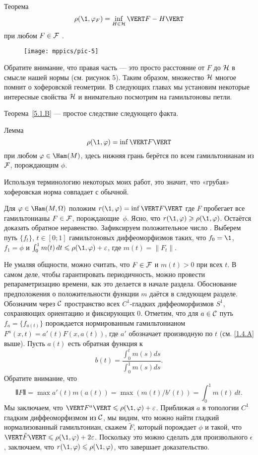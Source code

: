 \begin{thm}{Теорема}\label{5.1.B}
\[\rho (\1, \phi_F) = \inf_{H\in\H} \VERT F - H \VERT\]
при любом $F \in \mathcal{F}$ .
\end{thm}

\begin{figure}[ht!]
\vskip0mm
\centering
\texttt{[image: mppics/pic-5]}
\caption{}\label{pic-5}
\vskip0mm
\end{figure}

Обратите внимание, что правая часть — это просто расстояние от $F$ до $\mathcal{H}$ в смысле нашей нормы (см. рисунок 5).
Таким образом, множество $\mathcal{H}$ многое помнит о хоферовской геометрии.
В следующих главах мы установим некоторые интересные свойства $\mathcal{H}$ и внимательно посмотрим на гамильтоновы петли.

Теорема~\ref{5.1.B} — простое следствие следующего факта.

\begin{thm}{Лемма}\label{5.1.C}
\[\rho (\1, \phi) = \inf \VERT F \VERT\]
при любом $\phi \in \Ham (M)$, здесь нижняя грань берётся по всем гамильтонианам из $\mathcal{F}$, порождающим $\phi$.
\end{thm}

Используя терминологию некоторых моих работ, это значит, что «грубая» хоферовская норма совпадает с обычной.

Для $\phi \in \Ham (M, \Omega)$ положим $r (\1, \phi) \z= \inf \VERT F
\VERT$ где $F$ пробегает все гамильтонианы $F \in \mathcal{F}$,
порождающие~$\phi$. 
Ясно, что $r (\1, \phi) \ge \rho (\1, \phi)$.
Остаётся доказать обратное неравенство. 
Зафиксируем положительное число .
Выберем путь $\{f_t\}$, $t \in [0; 1]$ гамильтоновых диффеоморфизмов
таких, что $f_0 = \1$, $f_1 = \phi$ и  $\int_0^1 m (t)\,dt \le \rho
(\1, \phi) + \epsilon$, где $m (t) = \| F_t \|$.

Не умаляя общности, можно считать, что $F \in \mathcal{F}$ и $m (t)> 0$ при всех $t$.
В самом деле, чтобы гарантировать периодичность, можно провести
репараметризацию времени, как это
делается в начале раздела. 
Обоснование
предположения о положительности функции $m$
даётся в следующем разделе.
Обозначим через $\mathcal{C}$ пространство всех $C^1$-гладких диффеоморфизмов
$S^1$, сохраняющих ориентацию и фиксирующих $0$. 
Отметим, что для $a \in \mathcal{C}$ путь $f_a = \{f_{a(t)}\}$ порождается
нормированным гамильтонианом $F^a (x, t) = a' (t) F (x, a(t))$, где
$a'$ обозначает производную по $t$ (см. \ref{1.4.A} выше). 
Пусть $a(t)$ есть обратная функция к 
\[b(t)
=
\frac{\int_0^t m(s)ds}{\int_0^1 m(s)ds}.\]
Обратите внимание, что 
\[\VERT F \VERT = \max a' (t) m (a (t)) = \max (m (t) / b'(t)) = \int_0^1m (t)\,dt.\]
Мы заключаем, что $\VERT F^a \VERT \le \rho (\1, \phi) + \epsilon$.
Приближая $a$ в топологии $C^1$ гладким диффеоморфизмом из $\mathcal{C}$, мы видим, что можно найти гладкий нормализованный гамильтониан, скажем $\tilde F$, который порождает $\phi$ и такой, что $\VERT \tilde F \VERT \le \rho (\1, \phi) + 2\epsilon$.
Поскольку это можно сделать для произвольного $\epsilon$, заключаем, что $r (\1, \phi) \le \rho (\1, \phi)$, что завершает доказательство.
\qeds

